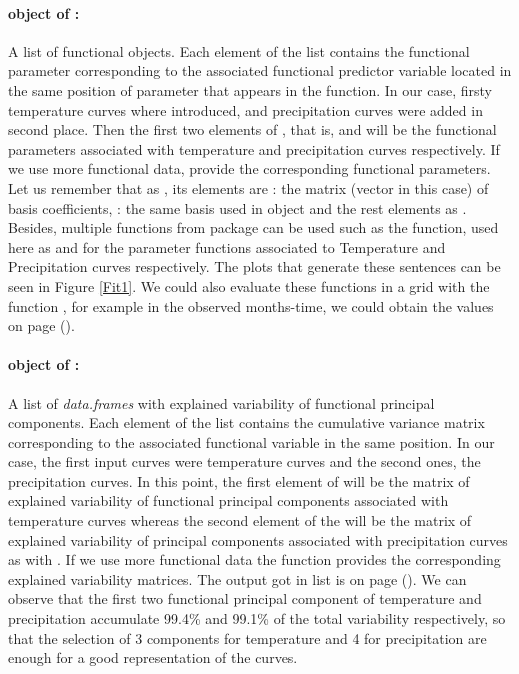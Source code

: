 \paragraph{ object of :} A list of functional objects. Each element of the list contains the functional parameter corresponding to the associated functional predictor variable located in the same position of  parameter that appears in the function. In our case, firsty temperature curves where introduced, and precipitation curves were added in second place. Then the first two elements of , that is, \code{[[1]]} and \code{[[2]]} will be the functional parameters associated with temperature and precipitation curves respectively. If we use more functional data,  provide the corresponding functional parameters. Let us remember that as , its elements are : the matrix (vector in this case) of basis coefficients, : the same basis used in  object and the rest elements as . Besides, multiple functions from  package can be used such as the  function, used here as  and  for the parameter  functions associated to Temperature and Precipitation curves respectively. The plots that generate these sentences can be seen in Figure \ref{Fit1}. We could also evaluate these functions in a grid with the function , for example in the observed months-time, we could obtain the values on page (\pageref{BasisEval}).

\paragraph{ object of :} A list of {\it data.frames} with explained variability of functional principal components. Each element of the list contains the cumulative variance matrix corresponding to the associated functional variable in the same position. In our case, the first input curves were temperature curves and the second ones, the precipitation curves. In this point, the first element \code{[[1]]} of  will be the matrix of explained variability of functional principal components associated with temperature curves whereas the second element \code{[[2]]} of the  will be the matrix of explained variability of principal components associated with precipitation curves as with . If we use more functional data  the function provides the corresponding explained variability matrices. \noindent The output got in  list is on page (\pageref{VarAcum}). We can observe that the first two functional principal component of temperature and precipitation accumulate 99.4\% and 99.1\% of the total variability respectively, so that the selection of 3 components for temperature and 4 for precipitation are enough for a good representation of the curves.

